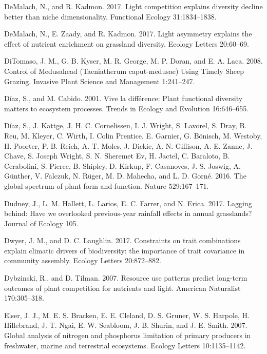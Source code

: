 \documentclass[twoside,12pt,final]{ucthesis-CA2012}
\begin{document}
\begin{ucmainmatter}
\leavevmode\hypertarget{ref-DeMalach2017b}{}%
DeMalach, N., and R. Kadmon. 2017. Light competition explains diversity decline better than niche dimensionality. Functional Ecology 31:1834--1838.

\leavevmode\hypertarget{ref-DeMalach2017a}{}%
DeMalach, N., E. Zaady, and R. Kadmon. 2017. Light asymmetry explains the effect of nutrient enrichment on grassland diversity. Ecology Letters 20:60--69.

\leavevmode\hypertarget{ref-DiTomaso2008}{}%
DiTomaso, J. M., G. B. Kyser, M. R. George, M. P. Doran, and E. A. Laca. 2008. Control of Medusahead (Taeniatherum caput-medusae) Using Timely Sheep Grazing. Invasive Plant Science and Management 1:241--247.

\leavevmode\hypertarget{ref-Diaz2001}{}%
Díaz, S., and M. Cabido. 2001. Vive la différence: Plant functional diversity matters to ecosystem processes. Trends in Ecology and Evolution 16:646--655.

\leavevmode\hypertarget{ref-Diaz2016}{}%
Díaz, S., J. Kattge, J. H. C. Cornelissen, I. J. Wright, S. Lavorel, S. Dray, B. Reu, M. Kleyer, C. Wirth, I. Colin Prentice, E. Garnier, G. Bönisch, M. Westoby, H. Poorter, P. B. Reich, A. T. Moles, J. Dickie, A. N. Gillison, A. E. Zanne, J. Chave, S. Joseph Wright, S. N. Sheremet Ev, H. Jactel, C. Baraloto, B. Cerabolini, S. Pierce, B. Shipley, D. Kirkup, F. Casanoves, J. S. Joswig, A. Günther, V. Falczuk, N. Rüger, M. D. Mahecha, and L. D. Gorné. 2016. The global spectrum of plant form and function. Nature 529:167--171.

\leavevmode\hypertarget{ref-Dudney2017}{}%
Dudney, J., L. M. Hallett, L. Larios, E. C. Farrer, and N. Erica. 2017. Lagging behind: Have we overlooked previous-year rainfall effects in annual grasslands? Journal of Ecology 105.

\leavevmode\hypertarget{ref-Dwyer2017}{}%
Dwyer, J. M., and D. C. Laughlin. 2017. Constraints on trait combinations explain climatic drivers of biodiversity: the importance of trait covariance in community assembly. Ecology Letters 20:872--882.

\leavevmode\hypertarget{ref-Dybzinski2007a}{}%
Dybzinski, R., and D. Tilman. 2007. Resource use patterns predict long-term outcomes of plant competition for nutrients and light. American Naturalist 170:305--318.

\leavevmode\hypertarget{ref-Elser2007}{}%
Elser, J. J., M. E. S. Bracken, E. E. Cleland, D. S. Gruner, W. S. Harpole, H. Hillebrand, J. T. Ngai, E. W. Seabloom, J. B. Shurin, and J. E. Smith. 2007. Global analysis of nitrogen and phosphorus limitation of primary producers in freshwater, marine and terrestrial ecosystems. Ecology Letters 10:1135--1142.


\end{ucmainmatter}
\end{document}
